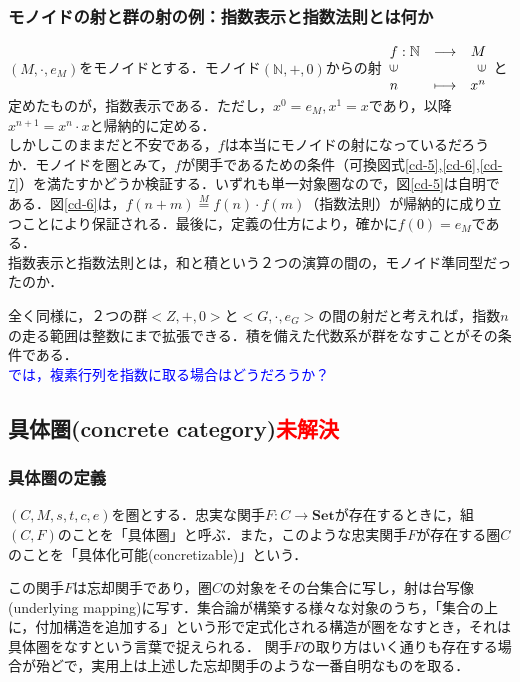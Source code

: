 \documentclass[uplatex, 12pt, a4paper, dvipdfmx]{jsarticle}
\begin{document}
\subsubsection{モノイドの射と群の射の例：指数表示と指数法則とは何か}
$(M,\cdot, e_M)$をモノイドとする．モノイド$(\mathbb{N},+,0)$からの射$\begin{array}{lcr}f:\mathbb{N}&\longrightarrow &M\\ \rotatebox{90}{$\in$} & & \rotatebox{90}{$\in$} \\ n & \longmapsto & x^n \end{array}$と定めたものが，指数表示である．ただし，$x^0 = e_M, x^1 = x$であり，以降$x^{n+1}=x^n\cdot x$と帰納的に定める．\\
しかしこのままだと不安である，$f$は本当にモノイドの射になっているだろうか．モノイドを圏とみて，$f$が関手であるための条件（可換図式\ref{cd-5},\ref{cd-6},\ref{cd-7}）を満たすかどうか検証する．いずれも単一対象圏なので，図\ref{cd-5}は自明である．図\ref{cd-6}は，$f(n+m)\overset{M}{=}f(n)\cdot f(m)$（指数法則）が帰納的に成り立つことにより保証される．最後に，定義の仕方により，確かに$f(0)=e_M$である．\\
指数表示と指数法則とは，和と積という２つの演算の間の，モノイド準同型だったのか．\par
全く同様に，２つの群$<Z,+,0>$と$<G,\cdot, e_G>$の間の射だと考えれば，指数$n$の走る範囲は整数にまで拡張できる．積を備えた代数系が群をなすことがその条件である．\\
\textcolor{blue}{では，複素行列を指数に取る場合はどうだろうか？}

\subsection{具体圏(concrete category)\textcolor{red}{未解決}}

\subsubsection{具体圏の定義}
\begin{shadebox}\begin{definition}[具体圏]
    $(C,M,s,t,c,e)$を圏とする．忠実な関手$F:C\longrightarrow \mathbf{Set}$が存在するときに，組$(C,F)$のことを「具体圏」と呼ぶ．また，このような忠実関手$F$が存在する圏$C$のことを「具体化可能(concretizable)」という．
\end{definition}\end{shadebox}
この関手$F$は忘却関手であり，圏$C$の対象をその台集合に写し，射は台写像(underlying mapping)に写す．集合論が構築する様々な対象のうち，「集合の上に，付加構造を追加する」という形で定式化される構造が圏をなすとき，それは具体圏をなすという言葉で捉えられる．
関手$F$の取り方はいく通りも存在する場合が殆どで，実用上は上述した忘却関手のような一番自明なものを取る．
\end{document}
